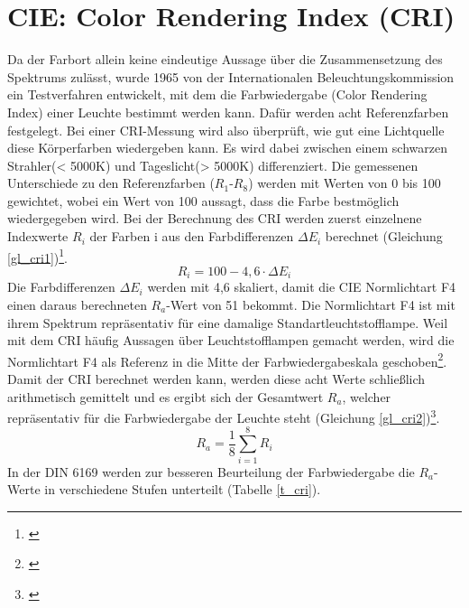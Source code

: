\section{CIE: Color Rendering Index (CRI)} \label{sec_cri}
Da der Farbort allein keine eindeutige Aussage über die Zusammensetzung des Spektrums zulässt, wurde 1965 von der Internationalen Beleuchtungskommission ein Testverfahren entwickelt, mit dem die Farbwiedergabe (Color Rendering Index) einer Leuchte bestimmt werden kann. Dafür werden acht Referenzfarben festgelegt. Bei einer CRI-Messung wird also überprüft, wie gut eine Lichtquelle diese Körperfarben wiedergeben kann. Es wird dabei zwischen einem schwarzen Strahler(< 5000K) und Tageslicht(> 5000K) differenziert. Die gemessenen Unterschiede zu den Referenzfarben ($R_{1}$-$R_{8}$) werden mit Werten von 0 bis 100 gewichtet, wobei ein Wert von 100 aussagt, dass die Farbe bestmöglich wiedergegeben wird. Bei der Berechnung des CRI werden zuerst einzelnene Indexwerte $R_{i}$ der Farben i aus den Farbdifferenzen $\Delta E_{i}$ berechnet (Gleichung \ref{gl_cri1})\footnote{\cite{davis_ohno}}.
	\begin{equation}\label{gl_cri1}
		R_{i} = 100 - 4,6 \cdot \Delta E_{i}
	\end{equation}
Die Farbdifferenzen $\Delta E_{i}$ werden mit 4,6 skaliert, damit die CIE Normlichtart F4 einen daraus berechneten $R_{a}$-Wert von 51 bekommt. Die Normlichtart F4 ist mit ihrem Spektrum repräsentativ für eine damalige  Standartleuchtstofflampe. Weil mit dem CRI häufig Aussagen über Leuchtstofflampen gemacht werden, wird die Normlichtart F4 als Referenz in die Mitte der Farbwiedergabeskala geschoben\footnote{\cite{housmoss}}.\\
Damit der CRI berechnet werden kann, werden diese acht Werte  schließlich arithmetisch gemittelt und es ergibt sich der Gesamtwert $R_{a}$,  welcher repräsentativ für die Farbwiedergabe der Leuchte steht (Gleichung \ref{gl_cri2})\footnote{\cite{production partner}}.
	\begin{equation}\label{gl_cri2}
		R_{a} =\frac{1}{8} \sum_{i=1}^{8} R_{i}
	\end{equation}
In der DIN 6169 werden zur besseren Beurteilung der Farbwiedergabe die $R_{a}$-Werte in verschiedene Stufen unterteilt (Tabelle \ref{t_cri}).

